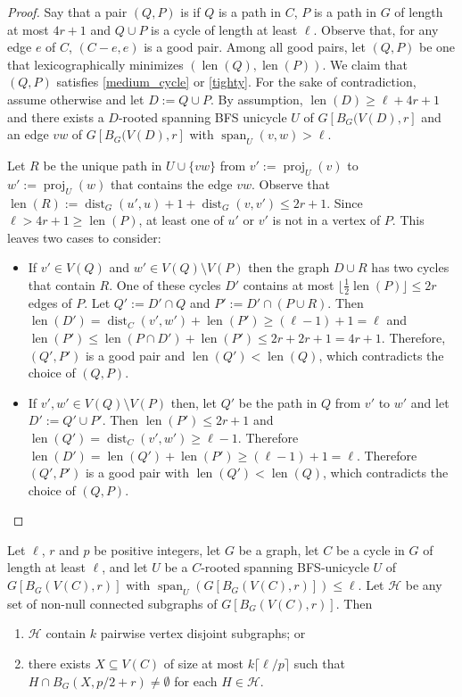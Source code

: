 \documentclass{patmorin}
\DeclareMathOperator{\len}{len}
\DeclareMathOperator{\proj}{proj}
\DeclareMathOperator{\spn}{span}
\DeclareMathOperator{\dist}{dist}
\begin{document}
\begin{proof}
  Say that a pair $(Q,P)$ is  if $Q$ is a path in $C$, $P$ is a path in $G$ of length at most $4r+1$ and $Q\cup P$ is a cycle of length at least $\ell$. Observe that, for any edge $e$ of $C$, $(C-e,e)$ is a good pair.  Among all good pairs, let $(Q,P)$ be one that lexicographically minimizes $(\len(Q),\len(P))$.  We claim that $(Q,P)$ satisfies \ref{medium_cycle} or \ref{tighty}.  For the sake of contradiction, assume otherwise and let $D:=Q\cup P$. By assumption, $\len(D)\ge\ell+4r+1$ and there exists a $D$-rooted spanning BFS unicycle $U$ of $G[B_G(V(D),r]$ and an edge $vw$ of $G[B_G(V(D),r]$ with $\spn_U(v,w)>\ell$.

  Let $R$ be the unique path in $U\cup\{vw\}$ from $v':=\proj_U(v)$ to $w':=\proj_U(w)$ that contains the edge $vw$.  Observe that $\len(R):=\dist_G(u',u)+1+\dist_G(v,v')\le 2r+1$.  Since $\ell>4r+1\ge \len(P)$, at least one of $u'$ or $v'$ is not in a vertex of $P$. This leaves two cases to consider:
  \begin{itemize}%
    \item If $v'\in V(Q)$ and $w'\in V(Q)\setminus V(P)$ then the graph $D\cup R$ has two cycles that contain $R$.  One of these cycles $D'$ contains at most $\lfloor\tfrac{1}{2}\len(P)\rfloor\le 2r$ edges of $P$.  Let $Q':=D'\cap Q$ and $P':=D'\cap (P\cup R)$.    Then $\len(D')= \dist_{C}(v',w')+\len(P') \ge (\ell-1)+1=\ell$ and $\len(P')\le \len(P\cap D')+\len(P')\le 2r+2r+1=4r+1$. Therefore, $(Q',P')$ is a good pair and $\len(Q')<\len(Q)$, which contradicts the choice of $(Q,P)$.

    \item If $v',w'\in V(Q)\setminus V(P)$ then, let $Q'$ be the path in $Q$ from $v'$ to $w'$ and let $D':=Q'\cup P'$.  Then $\len(P')\le 2r+1$ and $\len(Q')=\dist_C(v',w')\ge \ell-1$.  Therefore $\len(D')=\len(Q')+\len(P')\ge (\ell-1)+1=\ell$. Therefore $(Q',P')$ is a good pair with $\len(Q')<\len(Q)$, which contradicts the choice of $(Q,P)$. \qedhere
  \end{itemize}
\end{proof}

\begin{lem}\label{hit_with_no_long_edges}
  Let $\ell$, $r$ and $p$ be positive integers, let $G$ be a graph, let $C$ be a cycle in $G$ of length at least $\ell$, and let $U$ be a $C$-rooted spanning BFS-unicycle $U$ of $G[B_G(V(C),r)]$ with $\spn_U(G[B_G(V(C),r)])\le\ell$. Let $\mathcal{H}$ be any set of non-null connected subgraphs of $G[B_G(V(C),r)]$. Then
  \begin{enumerate}[nosep,nolistsep,label=\rm(\alph*),ref=(\alph*)]
    \item\label{packing} $\mathcal{H}$ contain $k$ pairwise vertex disjoint subgraphs; or
    \item\label{hitting} there exists $X\subseteq V(C)$ of size at most $k\lceil\ell/p\rceil$ such that $H\cap B_G(X,p/2+r)\neq\emptyset$ for each $H\in\mathcal{H}$.
  \end{enumerate}
\end{lem}
\end{document}
